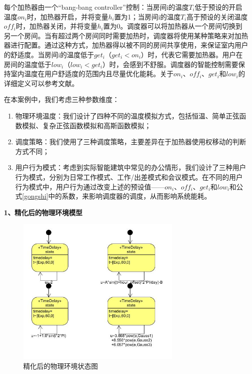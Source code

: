 	每个加热器由一个``bang-bang controller''控制：当房间i的温度$T_{i}$低于预设的开启温度$on_{i}$时，加热器开启，并将变量$h_{i}$置为1；当房间i的温度$T_{i}$高于预设的关闭温度$off_{i}$时，加热器关闭，并将变量$h_{i}$置为0。调度器可以将加热器从一个房间切换到另一个房间。当有超过两个房间同时需要加热时，调度器将使用某种策略来对加热器进行配置。通过这种方式，加热器得以被不同的房间共享使用，来保证室内用户的舒适度。当房间i的温度低于$get_{i}$（$get_{i}<on_{i}$）时，代表它需要加热器。用户在房间的温度低于$low_{i}$（$low_{i}<get_{i}$）时，会感到不舒服。调度器的智能控制需要保持室内温度在用户舒适度的范围内且尽量优化能耗。关于$on_{i}$、$off_{i}$、$get_{i}$和$low_{i}$的详细定义可以参考文献\citep{DBLP:conf/compsac/ChenGCDLS15}。
	
	在本案例中，我们考虑三种参数维度：
	\begin{enumerate}
	\item 物理环境温度：我们设计了四种不同的温度模拟方式，包括恒温、简单正弦函数模拟、复杂正弦函数模拟和高斯函数模拟；
	\item 调度策略：我们使用了三种调度策略，主要差异在于加热器使用权移动的判断方式不同；
	\item 用户行为模式：考虑到实际智能建筑中常见的办公情形，我们设计了三种用户行为模式，分别为日常工作模式、工作/出差模式和会议模式。在不同的用户行为模式中，用户行为通过改变上述的预设值——$on_{i}$、$off_{i}$、$get_{i}$和$low_{i}$和公式\ref{gongshi}中的系数，来影响调度器的调度，从而影响系统能耗。
	\end{enumerate}

\textbf{1、精化后的物理环境模型}

	\begin{figure}[!t]
	\centering
	\includegraphics[width=3.2in]{weather-sm2.jpg}
	\caption{精化后的物理环境状态图}
	\label{weather-sm2}
	\end{figure}
	
